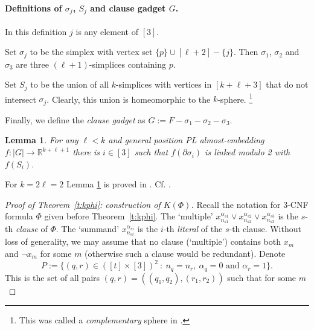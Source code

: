 \documentclass[runningheads]{llncs}
\newtheorem{lemma}[theorem]{Lemma}
\theoremstyle{remark}
\theoremstyle{definition}
\newcommand{\R}{\mathbb{R}}
\begin{document}
{\paragraph{Definitions of $\sigma_j$, $S_j$ and  clause gadget $G$.}
In this definition $j$ is any element of $[3]$.

Set $\sigma_j$ to be the simplex with vertex set $\{p\}\cup[\ell+2]-\{j\}$.
Then $\sigma_1$, $\sigma_2$ and $\sigma_3$ are three $(\ell+1)$-simplices containing $p$.

Set $S_j$ to be the union of all $k$-simplices with vertices in $[k +\ell + 3]$ that do not intersect $\sigma_j$.
Clearly, this union is homeomorphic to the $k$-sphere.%
\footnote{This was called a {\it complementary} sphere in \cite{MaTaWa11}.}

Finally, we define the \emph{clause gadget} as $G:=F-\sigma_1-\sigma_2-\sigma_3$.


\begin{lemma}\label{l:5.1}
For any $\ell<k$ and general position PL almost-embedding $f:|G|\to \R^{k +\ell + 1}$ there is $i\in[3]$ such that $f(\partial\sigma_i)$ is linked modulo 2 with $f(S_i)$.
\end{lemma}

For $k=2\ell=2$ Lemma \ref{l:5.1} is proved in \cite[proof of Lemma 8]{FKT}.
Cf. \cite[Remark 2.3.b]{AMSW}.

\begin{proof}[Proof of Theorem~\ref{t:kphi}: construction of $K(\Phi)$]
Recall the notation for $3$-CNF formula $\Phi$ given before Theorem~\ref{t:kphi}.
The  `multiple' $x_{n_{s1}}^{\alpha_{s1}}\vee x_{n_{s2}}^{\alpha_{s2}}\vee x_{n_{s3}}^{\alpha_{s3}}$ is the $s$-th \emph{clause} of $\Phi$.
The   `summand' $x_{n_{si}}^{\alpha_{si}}$  is the $i$-th \emph{literal} of the $s$-th clause.
Without loss of generality, we may assume that no clause (`multiple') contains both $x_m$ and $\neg x_m$ for some $m$
(otherwise such a clause would be redundant).
Denote
$$P:=\{(q,r)\in([t]\times[3])^2\ :\ n_q=n_r,\ \alpha_q=0\text{ and }\alpha_r=1\}.$$
This is the set of all pairs $(q,r)=((q_1,q_2),(r_1,r_2))$ such that for some $m$


\end{proof}}
\end{document}
